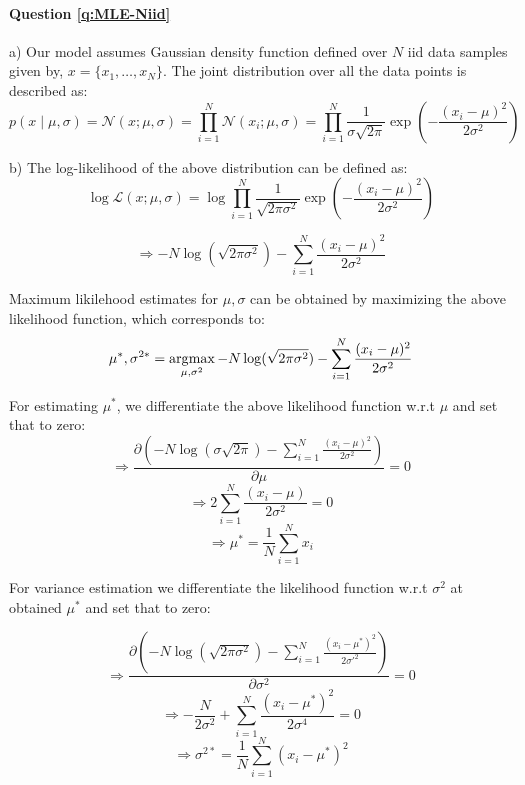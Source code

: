 \paragraph{Question \ref{q:MLE-Niid}} 
a) 
    Our model assumes Gaussian density function defined over $N$ iid data samples given by, $x=\{x_1, \dots, x_N\}$.
    The joint distribution over all the data points is described as:
    $$p(x \mid \mu, \sigma) = \mathcal{N}(x; \mu, \sigma) = \prod_{i=1}^N \mathcal{N}(x_i; \mu, \sigma)=\prod_{i=1}^N \frac{1}{\sigma \sqrt{2\pi}}\exp(-\frac{(x_i - \mu)^2}{2\sigma^2})$$

b) 
    The log-likelihood of the above distribution can be defined as:
    $$\log \mathcal{L}(x; \mu, \sigma) = \log \prod_{i=1}^N \frac{1}{\sqrt{2\pi \sigma^2}}\exp(-\frac{(x_i - \mu)^2}{2\sigma^2})$$
    
    $$\Rightarrow -N \log (\sqrt{2\pi \sigma^2}) - \sum_{i=1}^N \frac{(x_i - \mu)^2}{2\sigma^2}$$

    Maximum likilehood estimates for $\mu, \sigma$ can be obtained by maximizing the above likelihood function, which corresponds to:
    $$\mu^*, \sigma^{2*} = \operatorname*{\arg\!\max}_{\mu, \sigma^2} -N \log (\sqrt{2\pi \sigma^2}) - \sum_{i=1}^N \frac{(x_i - \mu)^2}{2\sigma^2}$$
    
    For estimating $\mu^*$, we differentiate the above likelihood function w.r.t $\mu$ and set that to zero:
    $$ \Rightarrow \frac{\partial (-N \log (\sigma \sqrt{2\pi}) - \sum_{i=1}^N \frac{(x_i - \mu)^2}{2\sigma^2})}{\partial \mu} = 0$$
    $$ \Rightarrow  2\sum_{i=1}^N \frac{(x_i - \mu)}{2\sigma^2} = 0$$
    $$ \Rightarrow \mu^* = \frac{1}{N} \sum_{i=1}^N x_i$$

    For variance estimation we differentiate the likelihood function w.r.t $\sigma^2$ at obtained $\mu^*$ and set that to zero:
    
    $$ \Rightarrow \frac{\partial (-N \log (\sqrt{2\pi\sigma^2}) - \sum_{i=1}^N \frac{(x_i - \mu^*)^2}{2\sigma'^2})}{\partial \sigma^2} = 0$$
    $$ \Rightarrow -\frac{N}{2 \sigma^2} + \sum_{i=1}^N \frac{(x_i - \mu^*)^2}{2\sigma^4} = 0$$
    $$ \Rightarrow \sigma^{2*} = \frac{1}{N} \sum_{i=1}^N (x_i - \mu^*)^2$$
    
